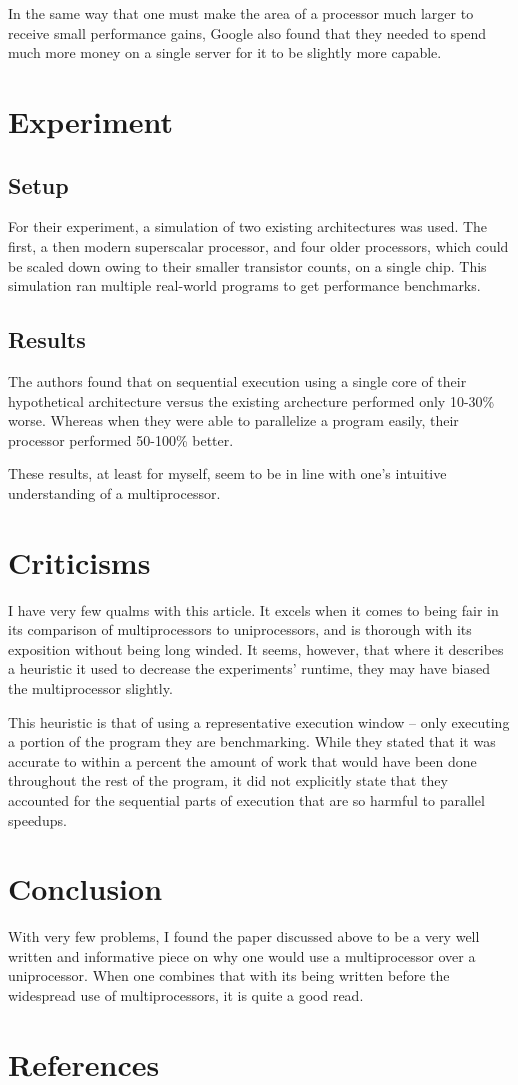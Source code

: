 \documentclass[12pt, twocolumn]{article}
\begin{document}
In the same way that one must make the area of a processor much larger to
receive small performance gains, Google also found that they needed to spend
much more money on a single server for it to be slightly more capable.
\section{Experiment}
\subsection{Setup}
For their experiment, a simulation of two existing architectures was used. The
first, a then modern superscalar processor, and four older processors, which could
be scaled down owing to their smaller transistor counts, on a single chip. This
simulation ran multiple real-world programs to get performance benchmarks.
\subsection{Results}
The authors found that on sequential execution using a single core of their
hypothetical architecture versus the existing archecture performed only 10-30\%
worse. Whereas when they were able to parallelize a program easily, their
processor performed 50-100\% better.

These results, at least for myself, seem to be in line with one's intuitive
understanding of a multiprocessor.
\section{Criticisms}
I have very few qualms with this article. It excels when it comes to being fair
in its comparison of multiprocessors to uniprocessors, and is thorough with its
exposition without being long winded. It seems, however, that where it describes
a heuristic it used to decrease the experiments' runtime, they may have biased
the multiprocessor slightly.

This heuristic is that of using a representative execution window -- only
executing a portion of the program they are benchmarking. While they stated that
it was accurate to within a percent the amount of work that would have been done
throughout the rest of the program, it did not explicitly state that they
accounted for the sequential parts of execution that are so harmful to parallel
speedups.
\section{Conclusion}
With very few problems, I found the paper discussed above to be a very well
written and informative piece on why one would use a multiprocessor over a
uniprocessor. When one combines that with its being written before the
widespread use of multiprocessors, it is quite a good read.
\section{References}

\end{document}
